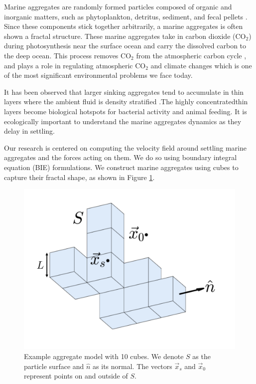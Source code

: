 Marine aggregates are randomly formed particles composed of organic and inorganic matters, such as phytoplankton, detritus, sediment, and fecal pellets \cite{jackson_simulation_1989}. Since these components stick together arbitrarily, a marine aggregates is often shown a fractal structure. 
These marine aggregates take in carbon dioxide (CO$_2$) during photosynthesis near the surface ocean and carry the dissolved carbon to the deep ocean. 
This process removes CO$_2$ from the atmospheric carbon cycle \cite{honjo_understanding_2014}, and plays a role in regulating atmospheric CO$_2$ and climate changes which is one of the most significant environmental problems we face today. 
 \par
 It has been observed that larger sinking aggregates tend to accumulate in thin layers where the ambient fluid is density stratified \cite{alldredge_occurrence_2002}.The highly concentratedthin layers become biological hotspots for bacterial activity and animal feeding. It is ecologically important to understand the marine aggregates dynamics as they delay in settling.
\par
Our research is centered on computing the velocity field around settling marine aggregates and the forces acting on them. We do so using boundary integral equation (BIE) formulations. We construct marine aggregates using cubes to capture their fractal shape, as shown in Figure \ref{fig_cube10}. 
\begin{figure}[ht]
	\begin{center}
		\includegraphics[scale=0.25]{figures/fig_cube10_CC.pdf}
	\end{center}
	\caption{Example aggregate model with 10 cubes. We denote $S$ as the particle surface and $\hat{n}$ as its normal. The vectors $\vec{x}_s$ and $\vec{x}_0$ represent points on and outside of $S$. }
	\label{fig_cube10}
\end{figure}

